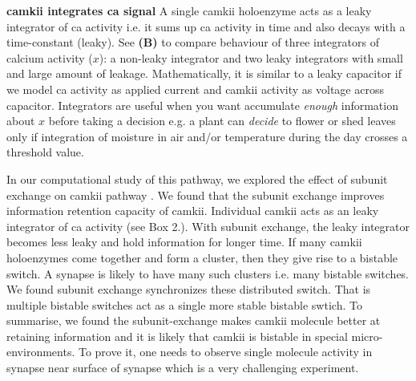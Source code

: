 \documentclass[]{resonance}
\begin{document}
{    \textbf{\gls{camkii} integrates \gls{ca} signal} A single \gls{camkii}
    holoenzyme acts as a leaky integrator of \gls{ca} activity i.e. it sums up
    \gls{ca} activity in time and also decays with a time-constant (leaky). See
    \textbf{(B)} to compare behaviour of three integrators of calcium activity
    ($x$): a non-leaky integrator and two leaky integrators with small and large
    amount of leakage.  Mathematically, it is similar to a leaky capacitor if we
    model \gls{ca} activity as applied current and \gls{camkii} activity as
    voltage across capacitor.  Integrators are useful when you want accumulate
    \emph{enough} information about $x$ before taking a decision e.g. a plant
    can \emph{decide} to flower or shed leaves only if integration of moisture
    in air and/or temperature during the day crosses a threshold value.

} %

In our computational study of this pathway, we explored the effect of subunit
exchange on \gls{camkii} pathway \cite{SinghAndBhalla2018}.  We found that the
subunit exchange improves information retention capacity of \gls{camkii}.
Individual \gls{camkii} acts as an leaky integrator of \gls{ca} activity (see
Box 2.). With subunit exchange, the leaky integrator becomes less leaky and hold
information for longer time. If many \gls{camkii} holoenzymes come together and
form a cluster, then they give rise to a bistable switch. A synapse is likely to
have many such clusters i.e. many bistable switches. We found subunit exchange
synchronizes these distributed switch. That is multiple bistable switches act as
a single more stable bistable swtich.  To summarise, we found the
subunit-exchange makes \gls{camkii} molecule better at retaining information and
it is likely that \gls{camkii} is bistable in special micro-environments. To
prove it, one needs to observe single molecule activity in synapse near surface
of synapse which is a very challenging experiment.
\end{document}
